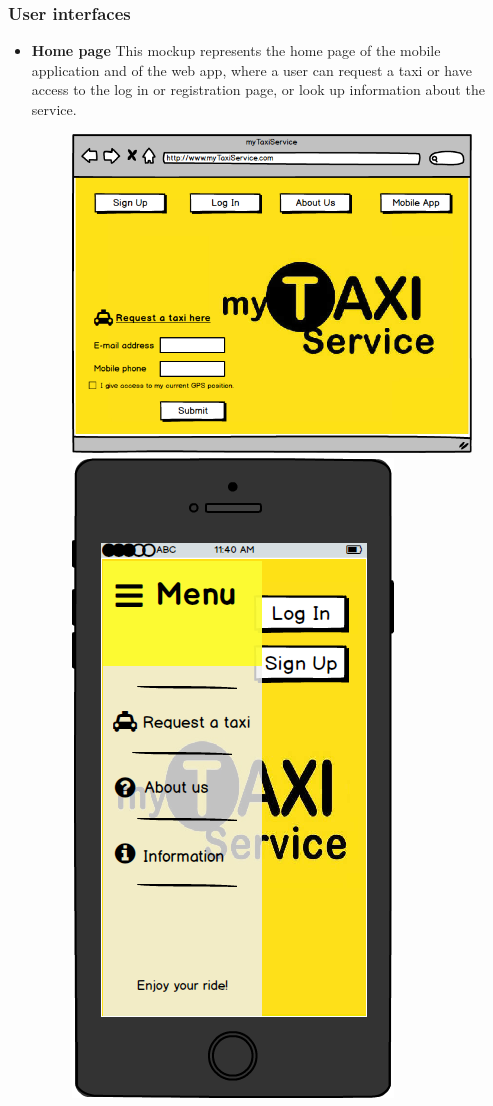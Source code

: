 \documentclass[18pt,oneside,a4paper, titlepage]{article}
\begin{document}
		\subsubsection{User interfaces}
			\begin{itemize}
				\item \textbf{Home page} This mockup represents the home page of the mobile application and of the web app, where a user can request a taxi or have access to the log in or registration page, or look up information about the service.
				\begin{figure}[h]
					\includegraphics[scale=0.3]{WebAppHomepage.png}%
					\qquad\qquad
					\includegraphics[scale=0.3]{MobileAppHomepage.png}
				

\end{figure}
\end{itemize}
\end{document}
